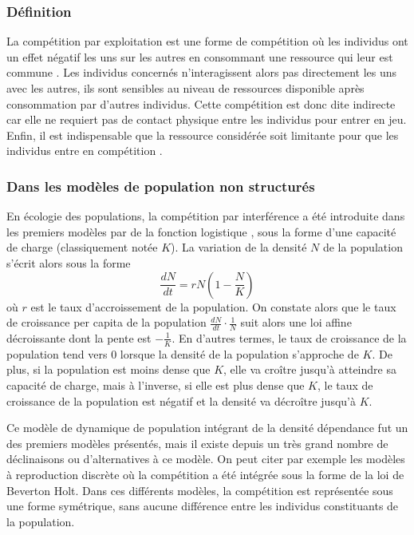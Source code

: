 \subsubsection{Définition}


La compétition par exploitation est une forme de compétition où les
individus ont un effet négatif les uns sur les autres en consommant une
ressource qui leur est commune \autocites{goss-custard1980a,
vance1984a, begon2009a}. Les individus concernés n'interagissent alors pas directement les
uns avec les autres, ils sont sensibles au niveau de ressources
disponible après consommation par d'autres individus. Cette compétition est
donc dite indirecte car elle ne requiert pas de contact physique entre les
individus pour entrer en jeu. Enfin, il est indispensable que la ressource
considérée soit limitante pour que les individus entre en compétition
\autocites{begon2009a}. 

\subsubsection{Dans les modèles de population non structurés}

En écologie des populations, la compétition par interférence a été introduite 
dans les premiers modèles par de la fonction logistique
\autocites{verhulst1838a}, sous la forme d'une capacité de charge (classiquement notée $K$). La variation
de la densité $N$ de la population s'écrit alors sous la forme
$$\frac{dN}{dt}=rN \left(1-\frac{N}{K}\right)$$ où $r$ est le taux
d'accroissement de la population. On constate alors que le taux de croissance
per capita de la population $\frac{dN}{dt}\cdot \frac{1}{N}$ suit alors une loi
affine décroissante dont la pente est $-\frac{1}{K}$. En d'autres termes, le
taux de croissance de la population tend vers 0 lorsque la densité de la
population s'approche de $K$. De plus, si la population est moins dense que $K$,
elle va croître jusqu'à atteindre sa capacité de charge, mais à l'inverse, si
elle est plus dense que $K$, le taux de croissance de la population est négatif
et la densité va décroître jusqu'à $K$.

Ce modèle de dynamique de population intégrant de la densité dépendance fut un
des premiers modèles présentés, mais il existe depuis un très grand nombre de
déclinaisons ou d'alternatives à ce modèle. On peut citer par exemple les
modèles à reproduction discrète où la compétition a été intégrée sous la forme
de la loi de Beverton Holt. Dans ces différents modèles, la compétition est
représentée sous une forme symétrique, sans aucune différence entre les
individus constituants de la population. 

